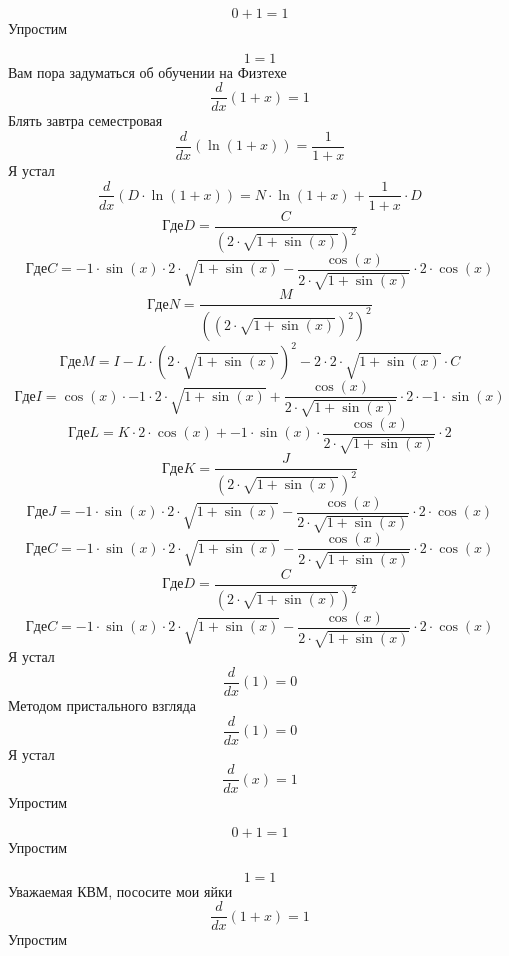 \documentclass[12pt, a4paper]{article}
\begin{document}
\begin{equation}
0+1 = 1
\end{equation}
Упростим

\begin{equation}
1 = 1
\end{equation}
Вам пора задуматься об обучении на Физтехе
\begin{equation}
\frac{d}{dx}(1+x) = 1
\end{equation}
Блять завтра семестровая
\begin{equation}
\frac{d}{dx}(\ln(1+x)) = \frac{1}{1+x}
\end{equation}
Я устал
\begin{equation}
\frac{d}{dx}(D \cdot \ln(1+x)) = N \cdot \ln(1+x)+\frac{1}{1+x} \cdot D
\end{equation}
$$Где D = \frac{C}{{(2 \cdot \sqrt{1+\sin(x)})}^{2}}$$
$$Где C = -1 \cdot \sin(x) \cdot 2 \cdot \sqrt{1+\sin(x)}-\frac{\cos(x)}{2 \cdot \sqrt{1+\sin(x)}} \cdot 2 \cdot \cos(x)$$
$$Где N = \frac{M}{{({(2 \cdot \sqrt{1+\sin(x)})}^{2})}^{2}}$$
$$Где M = I-L \cdot {(2 \cdot \sqrt{1+\sin(x)})}^{2}-2 \cdot 2 \cdot \sqrt{1+\sin(x)} \cdot C$$
$$Где I = \cos(x) \cdot -1 \cdot 2 \cdot \sqrt{1+\sin(x)}+\frac{\cos(x)}{2 \cdot \sqrt{1+\sin(x)}} \cdot 2 \cdot -1 \cdot \sin(x)$$
$$Где L = K \cdot 2 \cdot \cos(x)+-1 \cdot \sin(x) \cdot \frac{\cos(x)}{2 \cdot \sqrt{1+\sin(x)}} \cdot 2$$
$$Где K = \frac{J}{{(2 \cdot \sqrt{1+\sin(x)})}^{2}}$$
$$Где J = -1 \cdot \sin(x) \cdot 2 \cdot \sqrt{1+\sin(x)}-\frac{\cos(x)}{2 \cdot \sqrt{1+\sin(x)}} \cdot 2 \cdot \cos(x)$$
$$Где C = -1 \cdot \sin(x) \cdot 2 \cdot \sqrt{1+\sin(x)}-\frac{\cos(x)}{2 \cdot \sqrt{1+\sin(x)}} \cdot 2 \cdot \cos(x)$$
$$Где D = \frac{C}{{(2 \cdot \sqrt{1+\sin(x)})}^{2}}$$
$$Где C = -1 \cdot \sin(x) \cdot 2 \cdot \sqrt{1+\sin(x)}-\frac{\cos(x)}{2 \cdot \sqrt{1+\sin(x)}} \cdot 2 \cdot \cos(x)$$
Я устал
\begin{equation}
\frac{d}{dx}(1) = 0
\end{equation}
Методом пристального взгляда
\begin{equation}
\frac{d}{dx}(1) = 0
\end{equation}
Я устал
\begin{equation}
\frac{d}{dx}(x) = 1
\end{equation}
Упростим

\begin{equation}
0+1 = 1
\end{equation}
Упростим

\begin{equation}
1 = 1
\end{equation}
Уважаемая КВМ, пососите мои яйки
\begin{equation}
\frac{d}{dx}(1+x) = 1
\end{equation}
Упростим
\end{document}
